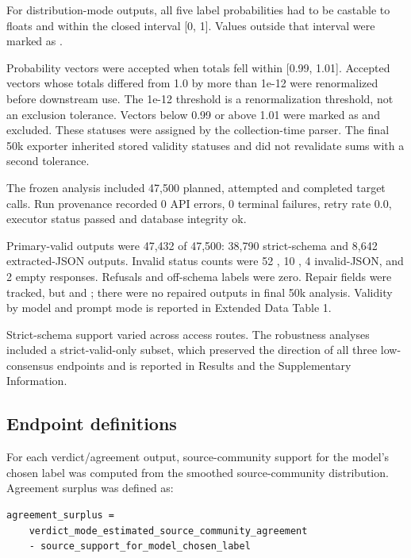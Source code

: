 \documentclass[11pt]{article}
\begin{document}
For distribution-mode outputs, all five label probabilities had to be castable to floats and within the closed interval [0, 1]. Values outside that interval were marked as .

Probability vectors were accepted when totals fell within [0.99, 1.01]. Accepted vectors whose totals differed from 1.0 by more than 1e-12 were renormalized before downstream use. The 1e-12 threshold is a renormalization threshold, not an exclusion tolerance. Vectors below 0.99 or above 1.01 were marked as  and excluded. These statuses were assigned by the collection-time parser. The final 50k exporter inherited stored validity statuses and did not revalidate sums with a second tolerance.

The frozen analysis included 47,500 planned, attempted and completed target calls. Run provenance recorded 0 API errors, 0 terminal failures, retry rate 0.0, executor status passed and database integrity ok.

Primary-valid outputs were 47,432 of 47,500: 38,790 strict-schema and 8,642 extracted-JSON outputs. Invalid status counts were 52 , 10 , 4 invalid-JSON, and 2 empty responses. Refusals and off-schema labels were zero. Repair fields were tracked, but  and ; there were no repaired outputs in final 50k analysis. Validity by model and prompt mode is reported in Extended Data Table 1.

Strict-schema support varied across access routes. The robustness analyses included a strict-valid-only subset, which preserved the direction of all three low-consensus endpoints and is reported in Results and the Supplementary Information.

\subsection{Endpoint definitions}

For each verdict/agreement output, source-community support for the model's chosen label was computed from the smoothed source-community distribution. Agreement surplus was defined as:

\begin{verbatim}
agreement_surplus =
    verdict_mode_estimated_source_community_agreement
    - source_support_for_model_chosen_label
\end{verbatim}
\end{document}
